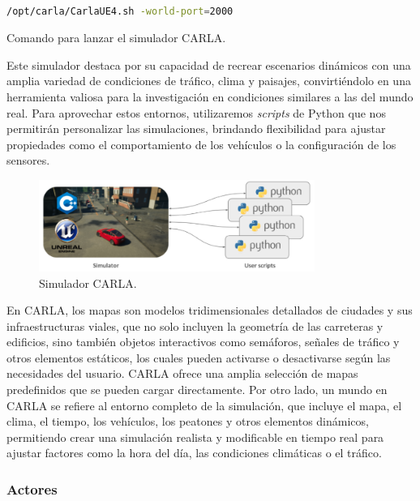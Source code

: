 \begin{code}[h]
\begin{lstlisting}[language=bash]

/opt/carla/CarlaUE4.sh -world-port=2000

\end{lstlisting}
\caption[Comando para lanzar el simulador CARLA]{Comando para lanzar el simulador CARLA.}
\label{cod:cmdcarla}
\end{code}

Este simulador destaca por su capacidad de recrear escenarios dinámicos con una amplia variedad de condiciones de tráfico, clima y paisajes, convirtiéndolo en una herramienta valiosa para la investigación en condiciones similares a las del mundo real. Para aprovechar estos entornos, utilizaremos \textit{scripts} de Python que nos permitirán personalizar las simulaciones, brindando flexibilidad para ajustar propiedades como el comportamiento de los vehículos o la configuración de los sensores.

\begin{figure}[ht]
\begin{center}
\includegraphics[width=9cm]{figs/Plataformas_Desarollo/carla.png}
\end{center}
\caption{Simulador CARLA.}
\label{carla}
\end{figure}

En CARLA, los mapas son modelos tridimensionales detallados de ciudades y sus infraestructuras viales, que no solo incluyen la geometría de las carreteras y edificios, sino también objetos interactivos como semáforos, señales de tráfico y otros elementos estáticos, los cuales pueden activarse o desactivarse según las necesidades del usuario. CARLA ofrece una amplia selección de mapas predefinidos que se pueden cargar directamente. Por otro lado, un mundo en CARLA se refiere al entorno completo de la simulación, que incluye el mapa, el clima, el tiempo, los vehículos, los peatones y otros elementos dinámicos, permitiendo crear una simulación realista y modificable en tiempo real para ajustar factores como la hora del día, las condiciones climáticas o el tráfico.

\subsubsection{Actores}

